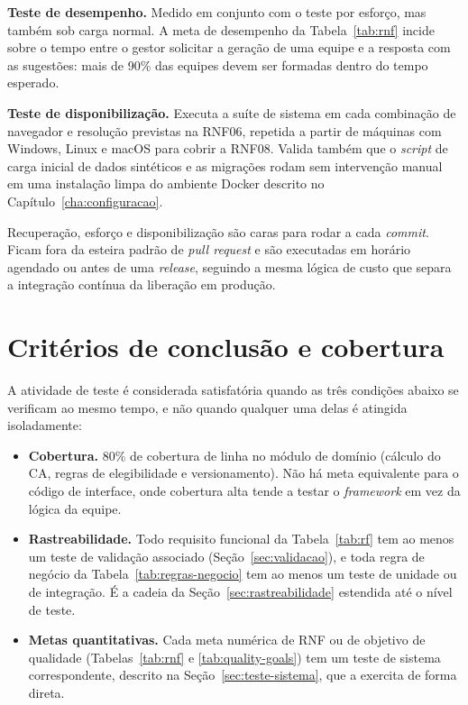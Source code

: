 \documentclass[a4paper,12pt,oneside,openany]{book}
\newif\iforientacoes
\newcommand{\orientacao}[1]{%
    \iforientacoes
        \begin{quote}
        \small\itshape\textbf{Orientação:} #1
        \end{quote}
    \fi
}
\begin{document}
\textbf{Teste de desempenho.} Medido em conjunto com o teste por esforço, mas
também sob carga normal. A meta de desempenho da Tabela~\ref{tab:rnf} incide
sobre o tempo entre o gestor solicitar a geração de uma equipe e a resposta com
as sugestões: mais de 90\% das equipes devem ser formadas dentro do tempo
esperado.

\textbf{Teste de disponibilização.} Executa a suíte de sistema em cada
combinação de navegador e resolução previstas na RNF06, repetida a partir de
máquinas com Windows, Linux e macOS para cobrir a RNF08. Valida também que o
\textit{script} de carga inicial de dados sintéticos e as migrações rodam sem
intervenção manual em uma instalação limpa do ambiente Docker descrito no
Capítulo~\ref{cha:configuracao}.

Recuperação, esforço e disponibilização são caras para rodar a cada
\textit{commit}. Ficam fora da esteira padrão de \textit{pull request} e são
executadas em horário agendado ou antes de uma \textit{release}, seguindo a
mesma lógica de custo que separa a integração contínua da liberação em
produção.

\section{Critérios de conclusão e cobertura}

\orientacao{Definam critérios que permitam decidir quando a atividade de
teste atingiu um nível satisfatório. A cobertura de código pode ser um dos
indicadores, mas não deve ser tratada isoladamente como garantia de qualidade.
Se uma meta quantitativa for adotada, indiquem o tipo de cobertura e
justifiquem a meta.}

A atividade de teste é considerada satisfatória quando as três condições
abaixo se verificam ao mesmo tempo, e não quando qualquer uma delas é atingida
isoladamente:

\begin{itemize}[nosep]
    \item \textbf{Cobertura.} 80\% de cobertura de linha no módulo de domínio
    (cálculo do CA, regras de elegibilidade e versionamento). Não há meta
    equivalente para o código de interface, onde cobertura alta tende a testar
    o \textit{framework} em vez da lógica da equipe.
    \item \textbf{Rastreabilidade.} Todo requisito funcional da
    Tabela~\ref{tab:rf} tem ao menos um teste de validação associado
    (Seção~\ref{sec:validacao}), e toda regra de negócio da
    Tabela~\ref{tab:regras-negocio} tem ao menos um teste de unidade ou de
    integração. É a cadeia da Seção~\ref{sec:rastreabilidade} estendida até o
    nível de teste.
    \item \textbf{Metas quantitativas.} Cada meta numérica de RNF ou de
    objetivo de qualidade (Tabelas~\ref{tab:rnf} e \ref{tab:quality-goals}) tem
    um teste de sistema correspondente, descrito na
    Seção~\ref{sec:teste-sistema}, que a exercita de forma direta.
\end{itemize}
\end{document}
